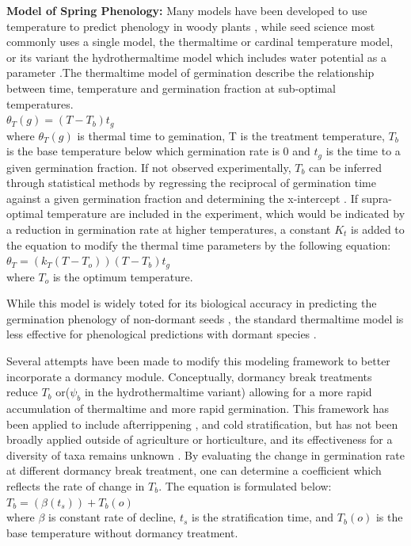 \documentclass[12pt]{article}\usepackage[]{graphicx}\usepackage[]{color}
\begin{document}
\textbf{Model of Spring Phenology:} Many models have been developed to use temperature to predict phenology in woody plants \citep{Chuine2002}, while seed science most commonly uses a single model, the thermaltime or cardinal temperature model, or its variant the hydrothermaltime model which includes water potential as a parameter \citep {Bradford2002}.The thermaltime model of germination describe the relationship between time, temperature and germination fraction at sub-optimal temperatures.\\
\indent$\theta_{T}(g)=(T-T_{b})t_{g}$\\
where $\theta_{T}(g)$ is thermal time to gemination, T is the treatment temperature, $T_b$ is the base temperature below which germination rate is 0 and $t_g$ is the time to a given germination fraction. If not observed experimentally, $T_b$ can be inferred through statistical methods by regressing the reciprocal of germination time against a given germination fraction and determining the x-intercept \citep{Pritchard1999}.
If supra-optimal temperature are included in the experiment, which would be indicated by a reduction in germination rate at higher temperatures, a constant $K_t$ is added to the equation to modify the thermal time parameters by the following equation:\\
\indent$\theta_{T}=(k_{T}(T-T_{o}))(T-T_{b})t_{g}$\\
where $T_o$ is the optimum temperature.
\par While this model is widely toted for its biological accuracy in predicting the germination phenology of non-dormant seeds \citep{Bradford2005}, the standard thermaltime model is less effective for phenological predictions with dormant species \citep{Batlla2015}.
\par Several attempts have been made to modify this modeling framework to better incorporate a dormancy module. Conceptually, dormancy break treatments reduce $T_b$ or($\psi_b$ in the hydrothermaltime variant) allowing for a more rapid accumulation of thermaltime and more rapid germination. This framework has been applied to include afterrippening \citep{Meyer2000}, and cold stratification\citep{Pritchard1996,Batlla2003}, but has not been broadly applied outside of agriculture or horticulture, and its effectiveness for a diversity of taxa remains unknown \citep{Steadman2004}. By evaluating the change in germination rate at different dormancy break treatment, one can determine a coefficient which reflects the rate of change in $T_b$. The equation is formulated below:\\
\indent$T_b= (\beta(t_s))+T_b(o)$\\
where $\beta$ is constant rate of decline, $t_s$ is the stratification time, and $T_b(o)$ is the base temperature without dormancy treatment.
\end{document}
